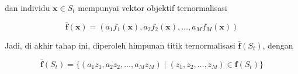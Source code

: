 dan individu $\mathbf{x} \in S_t$ mempunyai vektor objektif ternormalisasi 

\begin{equation}
  \bar{\mathbf{f}}(\mathbf{x}) = (a_1f_1(\mathbf{x}),a_2f_2(\mathbf{x}),\dots,a_Mf_M(\mathbf{x}))
\end{equation}

Jadi, di akhir tahap ini, diperoleh himpunan titik ternormalisasi $\bar{\mathbf{f}}(S_t)$, dengan 

\begin{equation}
  \bar{\mathbf{f}}(S_t)=\{(a_1z_1,a_2z_2,\dots,a_Mz_M) \mid (z_1,z_2,\dots,z_M) \in \mathbf{f}(S_t)\}
\end{equation}


